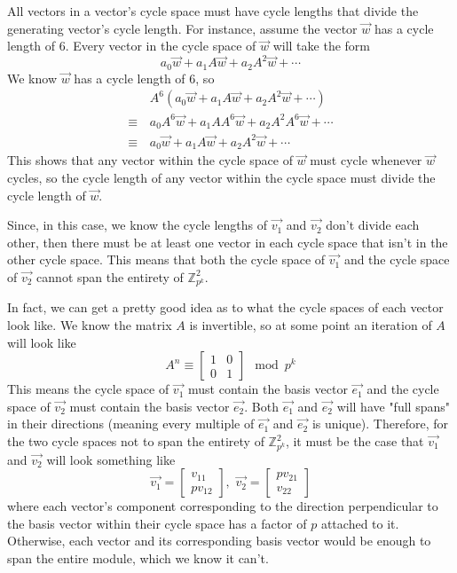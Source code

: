\documentclass[a4paper, 12pt, reqno]{amsart}
\begin{document}
	All vectors in a vector's cycle space must have cycle lengths that divide the generating vector's cycle length. For instance, assume the vector $\vec{w}$ has a cycle length
	of 6. Every vector in the cycle space of $\vec{w}$ will take the form
	\[
		a_{0}\vec{w} + a_{1}A\vec{w} + a_{2}A^{2}\vec{w} + \cdots
	\]
	We know $\vec{w}$ has a cycle length of 6, so
	\begin{align*}
		          & A^{6}(a_{0}\vec{w} + a_{1}A\vec{w} + a_{2}A^{2}\vec{w} + \cdots)         \\
		\equiv \, & a_{0}A^{6}\vec{w} + a_{1}AA^{6}\vec{w} + a_{2}A^{2}A^{6}\vec{w} + \cdots \\
		\equiv \, & a_{0}\vec{w} + a_{1}A\vec{w} + a_{2}A^{2}\vec{w} + \cdots
	\end{align*}
	This shows that any vector within the cycle space of $\vec{w}$ must cycle whenever $\vec{w}$ cycles, so the cycle length of any vector within the cycle space must divide
	the cycle length of $\vec{w}$.
	
	Since, in this case, we know the cycle lengths of $\vec{v_1}$ and $\vec{v_2}$ don't divide each other, then there must be at least one vector in each cycle space that isn't
	in the other cycle space. This means that both the cycle space of $\vec{v_1}$ and the cycle space of $\vec{v_2}$ cannot span the entirety of $\mathds{Z}_{p^k}^2$.
	
	In fact, we can get a pretty good idea as to what the cycle spaces of each vector look like. We know the matrix $A$ is invertible, so at some point an iteration of $A$ will
	look like
	\[
		A^n \equiv 
		\begin{bmatrix}
			1 & 0 \\
			0 & 1
		\end{bmatrix} \mod{p^k}
	\]
	This means the cycle space of $\vec{v_1}$ must contain the basis vector $\vec{e_1}$ and the cycle space of $\vec{v_2}$ must contain the basis vector $\vec{e_2}$. Both 
	$\vec{e_1}$ and $\vec{e_2}$ will have "full spans" in their directions (meaning every multiple of $\vec{e_1}$ and $\vec{e_2}$ is unique). Therefore, for the two cycle spaces
	not to span the entirety of $\mathds{Z}_{p^k}^2$, it must be the case that $\vec{v_1}$ and $\vec{v_2}$ will look something like
	\[
		\vec{v_1} = 
		\begin{bmatrix}
			v_{11} \\
			pv_{12}
		\end{bmatrix}, \, \, \vec{v_2} = 
		\begin{bmatrix}
			pv_{21} \\
			v_{22}
		\end{bmatrix}
	\]
	where each vector's component corresponding to the direction perpendicular to the basis vector within their cycle space has a factor of $p$ attached to it. Otherwise, each 
	vector and its corresponding basis vector would be enough to span the entire module, which we know it can't. 
	
\end{document}
